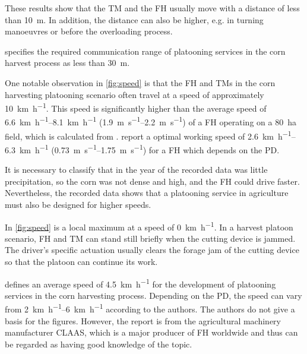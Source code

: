 These results show that the \ac{TM} and the \ac{FH} usually move with a distance of less than \SI{10}{\metre}.
In addition, the distance can also be higher, e.g. in turning manoeuvres or before the overloading process.

\textcite{smolnik_5g_2020} specifies the required communication range of platooning services in the corn harvest process
as less than \SI{30}{\metre}.

One notable observation in \autoref{fig:speed} is that the \ac{FH} and \acp{TM} in the corn harvesting platooning scenario
often travel at a speed of approximately \SI{10}{\kilo\metre\per\hour}.
This speed is significantly higher than the average speed of \SIrange{6.6}{8.1}{\kilo\metre\per\hour} (\SIrange{1.9}{2.2}{\metre\per\second}) of a \ac{FH} operating on a \SI{80}{\hectare} field, which is calculated from \cite{faustzahlen2018}.
\textcite{nedelcu_influence_2020} report a optimal working speed of \SIrange{2.6}{6.3}{\kilo\metre\per\hour} (\SIrange{0.73}{1.75}{\metre\per\second}) for a \ac{FH} which depends on the \ac{PD}.


It is necessary to classify that in the year of the recorded data was little precipitation, so the corn was not dense and high,
and the \ac{FH} could drive faster.
Nevertheless, the recorded data shows that a platooning service in agriculture must also be designed for higher speeds.

In \autoref{fig:speed} is a local maximum at a speed of \SI{0}{\kilo\metre\per\hour}.
In a harvest platoon scenario, \ac{FH} and \ac{TM} can stand still briefly when the cutting device is jammed.
The driver's specific actuation usually clears the forage jam of the cutting device so that the platoon can continue its work.

\textcite{smolnik_5g_2020} defines an average speed of \SI{4.5}{\kilo\metre\per\hour} for the development of platooning
services in the corn harvesting process.
Depending on the \ac{PD}, the speed can vary from \SIrange{2}{6}{\kilo\metre\per\hour} according to the authors.
The authors do not give a basis for the figures.
However, the report is from the agricultural machinery manufacturer CLAAS,
which is a major producer of \ac{FH} worldwide and thus can be regarded as having good knowledge of the topic.

